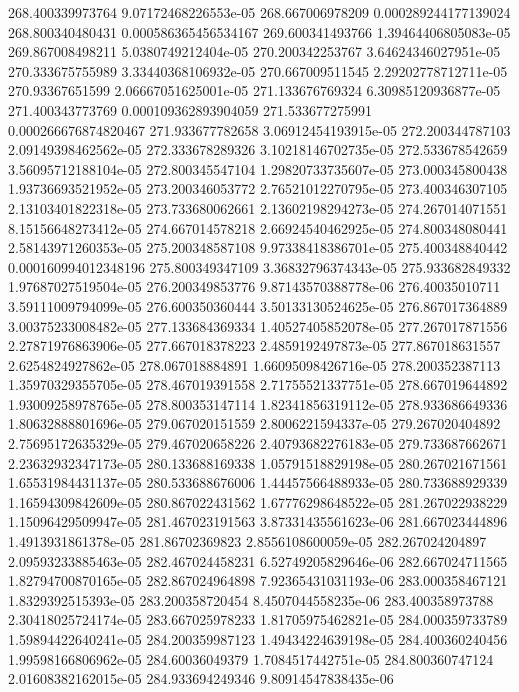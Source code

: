 {268.400339973764 9.07172468226553e-05
268.667006978209 0.000289244177139024
268.800340480431 0.000586365456534167
269.600341493766 1.39464406805083e-05
269.867008498211 5.0380749212404e-05
270.200342253767 3.64624346027951e-05
270.333675755989 3.33440368106932e-05
270.667009511545 2.29202778712711e-05
270.93367651599 2.06667051625001e-05
271.133676769324 6.30985120936877e-05
271.400343773769 0.000109362893904059
271.533677275991 0.000266676874820467
271.933677782658 3.06912454193915e-05
272.200344787103 2.09149398462562e-05
272.333678289326 3.10218146702735e-05
272.533678542659 3.56095712188104e-05
272.800345547104 1.29820733735607e-05
273.000345800438 1.93736693521952e-05
273.200346053772 2.76521012270795e-05
273.400346307105 2.13103401822318e-05
273.733680062661 2.13602198294273e-05
274.267014071551 8.15156648273412e-05
274.667014578218 2.66924540462925e-05
274.800348080441 2.58143971260353e-05
275.200348587108 9.97338418386701e-05
275.400348840442 0.000160994012348196
275.800349347109 3.36832796374343e-05
275.933682849332 1.97687027519504e-05
276.200349853776 9.87143570388778e-06
276.40035010711 3.59111009794099e-05
276.600350360444 3.50133130524625e-05
276.867017364889 3.00375233008482e-05
277.133684369334 1.40527405852078e-05
277.267017871556 2.27871976863906e-05
277.667018378223 2.4859192497873e-05
277.867018631557 2.6254824927862e-05
278.067018884891 1.66095098426716e-05
278.200352387113 1.35970329355705e-05
278.467019391558 2.71755521337751e-05
278.667019644892 1.93009258978765e-05
278.800353147114 1.82341856319112e-05
278.933686649336 1.80632888801696e-05
279.067020151559 2.8006221594337e-05
279.267020404892 2.75695172635329e-05
279.467020658226 2.40793682276183e-05
279.733687662671 2.23632932347173e-05
280.133688169338 1.05791518829198e-05
280.267021671561 1.65531984431137e-05
280.533688676006 1.44457566488933e-05
280.733688929339 1.16594309842609e-05
280.867022431562 1.67776298648522e-05
281.267022938229 1.15096429509947e-05
281.467023191563 3.87331435561623e-06
281.667023444896 1.4913931861378e-05
281.86702369823 2.8556108600059e-05
282.267024204897 2.09593233885463e-05
282.467024458231 6.52749205829646e-06
282.667024711565 1.82794700870165e-05
282.867024964898 7.92365431031193e-06
283.000358467121 1.8329392515393e-05
283.200358720454 8.4507044558235e-06
283.400358973788 2.30418025724174e-05
283.667025978233 1.81705975462821e-05
284.000359733789 1.59894422640241e-05
284.200359987123 1.49434224639198e-05
284.400360240456 1.99598166806962e-05
284.60036049379 1.7084517442751e-05
284.800360747124 2.01608382162015e-05
284.933694249346 9.80914547838435e-06
}
